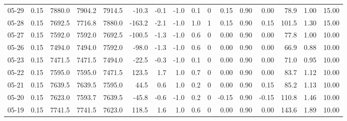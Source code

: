 \begin{threeparttable}
{\begin{tabular}{lrrrrrrrrrrrrrrr}
  05-29 &     0.15 & 7880.0 & 7904.2 & 7914.5 &      -10.3 &           -0.1 &                     -1.0 &                 0.1 &              0 &       0.15 &      0.90 &           0.00 &             78.9 &            1.00 &                  15.00 \\
  05-28 &     0.15 & 7692.5 & 7716.8 & 7880.0 &     -163.2 &           -2.1 &                     -1.0 &                 1.0 &              1 &       0.15 &      0.90 &           0.15 &            101.5 &            1.30 &                  15.00 \\
  05-27 &     0.15 & 7592.0 & 7592.0 & 7692.5 &     -100.5 &           -1.3 &                     -1.0 &                 0.6 &              0 &       0.00 &      0.90 &           0.00 &             77.8 &            1.00 &                  10.00 \\
  05-26 &     0.15 & 7494.0 & 7494.0 & 7592.0 &      -98.0 &           -1.3 &                     -1.0 &                 0.6 &              0 &       0.00 &      0.90 &           0.00 &             66.9 &            0.88 &                  10.00 \\
  05-23 &     0.15 & 7471.5 & 7471.5 & 7494.0 &      -22.5 &           -0.3 &                     -1.0 &                 0.1 &              0 &       0.00 &      0.90 &           0.00 &             71.0 &            0.95 &                  10.00 \\
  05-22 &     0.15 & 7595.0 & 7595.0 & 7471.5 &      123.5 &            1.7 &                      1.0 &                 0.7 &              0 &       0.00 &      0.90 &           0.00 &             83.7 &            1.12 &                  10.00 \\
  05-21 &     0.15 & 7639.5 & 7639.5 & 7595.0 &       44.5 &            0.6 &                      1.0 &                 0.2 &              0 &       0.00 &      0.90 &           0.15 &             85.2 &            1.13 &                  10.00 \\
  05-20 &     0.15 & 7623.0 & 7593.7 & 7639.5 &      -45.8 &           -0.6 &                     -1.0 &                 0.2 &              0 &      -0.15 &      0.90 &          -0.15 &            110.8 &            1.46 &                  10.00 \\
  05-19 &     0.15 & 7741.5 & 7741.5 & 7623.0 &      118.5 &            1.6 &                      1.0 &                 0.6 &              0 &       0.00 &      0.90 &           0.00 &            143.6 &            1.89 &                  10.00 \\

\end{tabular}}
\end{threeparttable}
